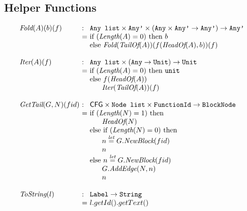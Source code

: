 \subsection{Helper Functions}
\[
\begin{array}{l@{}l@{~}l}
\Fold(A)(b)(f) & : & \TT{Any list} \times \TT{Any'} \times (\TT{Any} \times \TT{Any'} \rightarrow \TT{Any'}) \rightarrow \TT{Any'}\\
	& = & \mbox{if}\ (\Length(A) = 0)\ \mbox{then}\ b \\
	& & \mbox{else}\ \Fold(\TailOf(A))(f(\HeadOf(A),b))(f)\\
	& & \\
\Iter(A)(f) & : & \TT{Any list} \times (\TT{Any} \rightarrow \Unit) \rightarrow \Unit\\
	& = & \mbox{if}\ (\Length(A) = 0)\ \mbox{then}\ \TT{unit} \\
	& & \mbox{else}\ f(\HeadOf(A))\\
	& & \phantom{else} \Iter(\TailOf(A))(f)\\
	& & \\
\GetTail(G,N)(fid)\ & : & \CFG \times\Nodelist \times \FunctionId \rightarrow \BlockNode\\
	& = & \mbox{if}\ (\Length(N) = 1)\ \mbox{then}\\
	& & \phantom{else} \HeadOf(N) \\
	& & \mbox{else}\ \mbox{if}\ (\Length(N) = 0)\ \mbox{then}\\
	& & \phantom{else} n \letval G.\emph{NewBlock}(fid)\\
	& & \phantom{else} n\\
	& & \mbox{else}\ n \letval G.\emph{NewBlock}(fid)\\
	& & \phantom{else} G.\emph{AddEdge}(N,n)\\
	& & \phantom{else} n\\
	& & \\
\ToString(l) & : & \TT{Label}  \rightarrow \TT{String}\\
	& = & l.getId().getText()\\
	& & \\
\end{array}
\]

